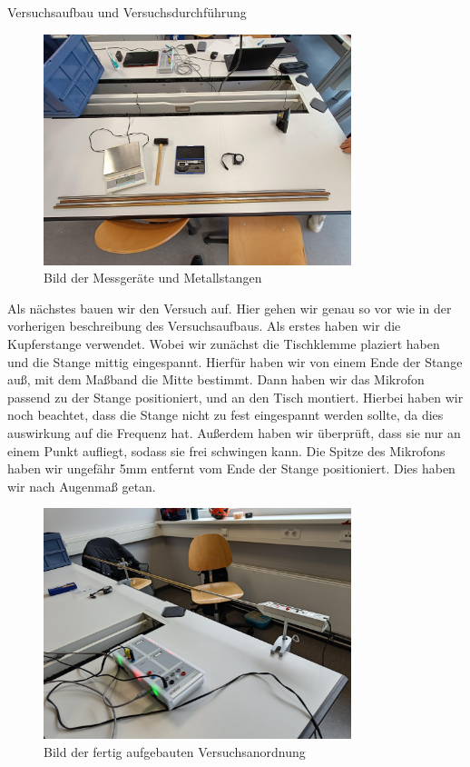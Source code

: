 \documentclass[twoside]{protokoll}
\begin{document}
\begin{aufgabe}{Versuchsaufbau und Versuchsdurchführung}
\begin{figure}[h]
  \centering
  \includegraphics[width=0.8\textwidth]{Bilder/434170_428396_1A3_Materialien.pdf}
  \caption{Bild der Messgeräte und Metallstangen}
  \centering
\end{figure}

Als nächstes bauen wir den Versuch auf. Hier gehen wir genau so vor wie in der vorherigen beschreibung des Versuchsaufbaus. Als erstes haben wir die Kupferstange verwendet.
Wobei wir zunächst die Tischklemme plaziert haben und die Stange mittig eingespannt. Hierfür haben wir von einem Ende der Stange auß, mit dem Maßband die Mitte bestimmt. Dann haben wir das Mikrofon passend zu der Stange positioniert, und an den Tisch montiert. Hierbei haben wir noch beachtet, dass die Stange nicht zu fest eingespannt werden sollte, da dies auswirkung auf die Frequenz hat. Außerdem haben wir überprüft, dass sie nur an einem Punkt aufliegt, sodass sie frei schwingen kann. Die Spitze des Mikrofons haben wir ungefähr 5mm entfernt vom Ende der Stange positioniert. Dies haben wir nach Augenmaß getan. 

\begin{figure}[h]
  \centering
  \includegraphics[width=0.8\textwidth]{Bilder/434170_428396_1A3_Gesamtaufbau.pdf}
  \caption{Bild der fertig aufgebauten Versuchsanordnung}
  \centering
\end{figure}


\end{aufgabe}
\end{document}
